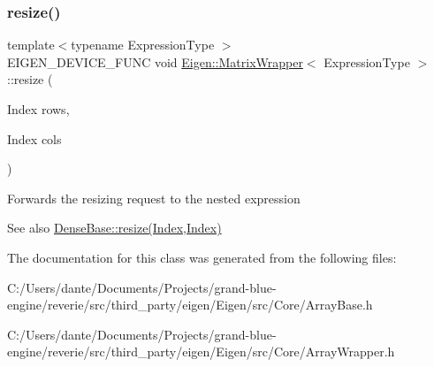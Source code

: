 \subsubsection{\texorpdfstring{resize()}{resize()}\hspace{0.1cm}{\footnotesize\ttfamily [2/2]}}
{\footnotesize\ttfamily template$<$typename Expression\+Type $>$ \\
E\+I\+G\+E\+N\+\_\+\+D\+E\+V\+I\+C\+E\+\_\+\+F\+U\+NC void \mbox{\hyperlink{class_eigen_1_1_matrix_wrapper}{Eigen\+::\+Matrix\+Wrapper}}$<$ Expression\+Type $>$\+::resize (\begin{DoxyParamCaption}\item[{Index}]{rows,  }\item[{Index}]{cols }\end{DoxyParamCaption})\hspace{0.3cm}{\ttfamily [inline]}}

Forwards the resizing request to the nested expression \begin{DoxySeeAlso}{See also}
\mbox{\hyperlink{class_eigen_1_1_dense_base_aef40c2ee48a85a799270c8258cc12b76}{Dense\+Base\+::resize(\+Index,\+Index)}} 
\end{DoxySeeAlso}


The documentation for this class was generated from the following files\+:\begin{DoxyCompactItemize}
\item 
C\+:/\+Users/dante/\+Documents/\+Projects/grand-\/blue-\/engine/reverie/src/third\+\_\+party/eigen/\+Eigen/src/\+Core/Array\+Base.\+h\item 
C\+:/\+Users/dante/\+Documents/\+Projects/grand-\/blue-\/engine/reverie/src/third\+\_\+party/eigen/\+Eigen/src/\+Core/Array\+Wrapper.\+h\end{DoxyCompactItemize}
